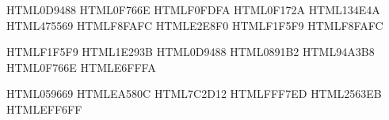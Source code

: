 \definecolor{accent}      {HTML}{0D9488} %
\definecolor{accentDark}  {HTML}{0F766E} %
\definecolor{accentPale}  {HTML}{F0FDFA} %
\definecolor{dark}        {HTML}{0F172A} %
\definecolor{coverBg}     {HTML}{134E4A} %
\definecolor{mid}         {HTML}{475569} %
\definecolor{light}       {HTML}{F8FAFC} %
\definecolor{border}      {HTML}{E2E8F0} %
\definecolor{tableHdr}    {HTML}{F1F5F9} %
\definecolor{sidebarBg}   {HTML}{F8FAFC} %

\definecolor{codeBg}      {HTML}{F1F5F9} 
\definecolor{codeText}    {HTML}{1E293B} 
\definecolor{codeKw}      {HTML}{0D9488} %
\definecolor{codeStr}     {HTML}{0891B2} %
\definecolor{codeCmt}     {HTML}{94A3B8} 
\definecolor{inlineCode}  {HTML}{0F766E} 
\definecolor{inlineBg}    {HTML}{E6FFFA} 

\definecolor{success}     {HTML}{059669} %
\definecolor{warn}        {HTML}{EA580C} %
\definecolor{warnDark}    {HTML}{7C2D12} 
\definecolor{warnBg}      {HTML}{FFF7ED} 
\definecolor{infoGreen}   {HTML}{2563EB} %
\definecolor{infoBg}      {HTML}{EFF6FF}